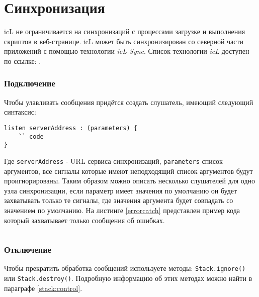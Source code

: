 \section{Синхронизация}
\label{sync}

icL не ограничивается на синхронизаций с процессами загрузке и выполнения скриптов в веб-странице. icL может быть синхронизирован со северной части приложений с помощью технологии \textit{icL-Sync}. Список технологии \textit{icL} доступен по ссылке: .

\subsubsection{Подключение}

Чтобы улавливать сообщения придётся создать слушатель, имеющий следующий синтаксис:
\begin{verbatim}
listen serverAddress : (parameters) {
	`` code
}
\end{verbatim}

Где \texttt{serverAddress} - URL сервиса синхронизаций, \texttt{parameters} список аргументов, все сигналы которые имеют неподходящий список аргументов будут проигнорированы. Таким образом можно описать несколько слушателей для одно узла синхронизации, если параметр имеет значения по умолчанию он будет захватывать только те сигналы, где значения аргумента будет совпадать со значением по умолчанию. На листинге \ref{errorcatch} представлен пример кода который захватывает только сообщения об ошибках.


\begin{sourcecode}
	\label{errorcatch}
    \inputminted[linenos]{icl}{../sources/errorcatch.icL}
\end{sourcecode}

\subsubsection{Отключение}

Чтобы прекратить обработка сообщений используете методы: \texttt{Stack.ignore()} или \texttt{Stack.destroy()}. Подробную информацию об этих методах можно найти в параграфе \ref{stack:control}.